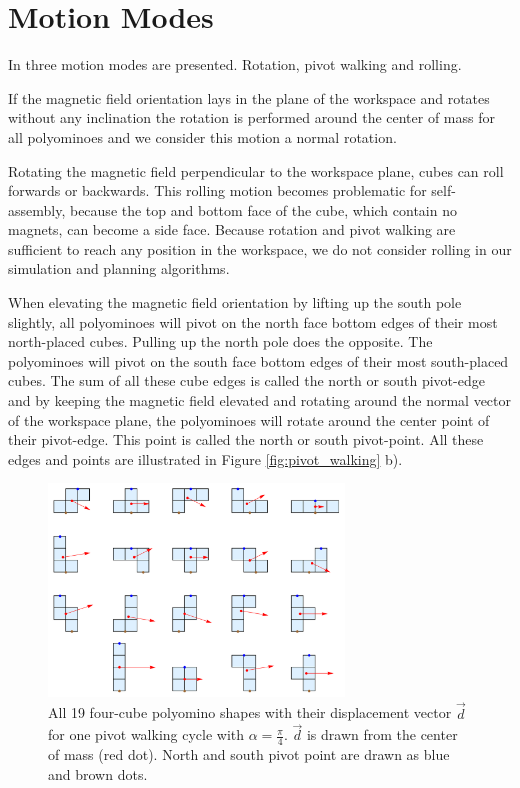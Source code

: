 \section{Motion Modes}
In \cite{Bhattacharjee2022} three motion modes are presented. Rotation, pivot walking and rolling.

If the magnetic field orientation lays in the plane of the workspace and rotates without any inclination the rotation is performed around the center of mass for all polyominoes and we consider this motion a normal rotation.

Rotating the magnetic field perpendicular to the workspace plane, cubes can roll forwards or backwards.
This rolling motion becomes problematic for self-assembly, because the top and bottom face of the cube, which contain no magnets, can become a side face.
Because rotation and pivot walking are sufficient to reach any position in the workspace, we do not consider rolling in our simulation and planning algorithms.

When elevating the magnetic field orientation by lifting up the south pole slightly, all polyominoes will pivot on the north face bottom edges of their most north-placed cubes.
Pulling up the north pole does the opposite. The polyominoes will pivot on the south face bottom edges of their most south-placed cubes.
The sum of all these cube edges is called the north or south pivot-edge and by keeping the magnetic field elevated and rotating around the normal vector of the workspace plane, the polyominoes will rotate around the center point of their pivot-edge.
This point is called the north or south pivot-point.
All these edges and points are illustrated in Figure \ref{fig:pivot_walking} b).

\begin{figure}
	\centering
	\includegraphics[width=0.70\textwidth]{figures/displacement_pivot_walking.png}
	\caption{All 19 four-cube polyomino shapes with their displacement vector $\vec{d}$ for one pivot walking cycle with $\alpha = \frac{\pi}{4}$. $\vec{d}$ is drawn from the center of mass (red dot). North and south pivot point are drawn as blue and brown dots.}
	\label{fig:displacement_pivot_walking}
\end{figure}

